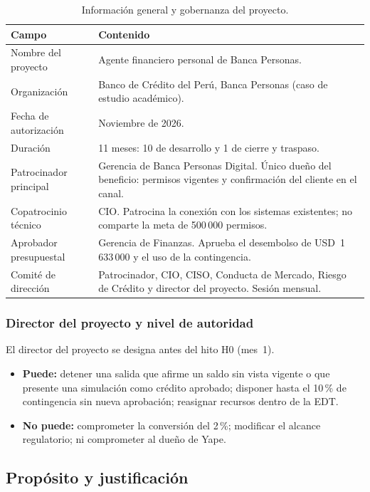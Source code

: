 \documentclass[11pt,a4paper]{article}
\newcommand{\usd}[1]{USD~#1}
\begin{document}
\begin{table}[H]
\centering
\caption{Información general y gobernanza del proyecto.}
\small
\begin{tabularx}{\textwidth}{@{}p{3.8cm} X@{}}
\toprule
\textbf{Campo} & \textbf{Contenido} \\
\midrule
Nombre del proyecto & Agente financiero personal de Banca Personas. \\
Organización & Banco de Crédito del Perú, Banca Personas (caso de estudio académico). \\
Fecha de autorización & Noviembre de 2026. \\
Duración & 11 meses: 10 de desarrollo y 1 de cierre y traspaso. \\
Patrocinador principal & Gerencia de Banca Personas Digital. Único dueño del beneficio: permisos vigentes y confirmación del cliente en el canal. \\
Copatrocinio técnico & CIO. Patrocina la conexión con los sistemas existentes; no comparte la meta de 500\,000 permisos. \\
Aprobador presupuestal & Gerencia de Finanzas. Aprueba el desembolso de \usd{1\,633\,000} y el uso de la contingencia. \\
Comité de dirección & Patrocinador, CIO, CISO, Conducta de Mercado, Riesgo de Crédito y director del proyecto. Sesión mensual. \\
\bottomrule
\end{tabularx}
\end{table}

\subsubsection{Director del proyecto y nivel de autoridad}

El director del proyecto se designa antes del hito H0 (mes~1).

\begin{itemize}
  \item \textbf{Puede:} detener una salida que afirme un saldo sin vista vigente o que presente una simulación como crédito aprobado; disponer hasta el 10\,\% de contingencia sin nueva aprobación; reasignar recursos dentro de la EDT.
  \item \textbf{No puede:} comprometer la conversión del 2\,\%; modificar el alcance regulatorio; ni comprometer al dueño de Yape.
\end{itemize}

\subsection{Propósito y justificación}
\end{document}
